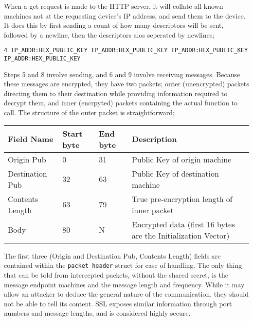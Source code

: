 \documentclass{article}
\begin{document}
When a get request is made to the HTTP server, it will collate all known machines not at the requesting device's IP address, and send them to the device. It does this by first sending a count of how many descriptors will be sent, followed by a newline, then the descriptors alos seperated by newlines;

\texttt{4 \newline
IP\_ADDR:HEX\_PUBLIC\_KEY \newline
IP\_ADDR:HEX\_PUBLIC\_KEY \newline
IP\_ADDR:HEX\_PUBLIC\_KEY \newline
IP\_ADDR:HEX\_PUBLIC\_KEY
}

Steps 5 and 8 involve sending, and 6 and 9 involve receiving messages. Because these messages are encrypted, they have two packets; outer (unencrypted) packets directing them to their destination while providing information required to decrypt them, and inner (encrpyted) packets containing the actual function to call. The structure of the outer packet is straightforward;

\begin{table}[h]
\begin{tabular}{|p{25mm}|l|l|p{45mm}|}
\hline
\textbf{Field Name}	& \textbf{Start byte}	& \textbf{End byte}		& \textbf{Description} \\ \hline
Origin Pub					& 0									& 31							& Public Key of origin machine \\ \hline
Destination Pub			& 32								& 63							& Public Key of destination machine \\ \hline
Contents Length			& 63								& 79							& True pre-encryption length of inner packet \\ \hline
Body								& 80								& N								& Encrypted data (first 16 bytes are the Initialization Vector) \\ \hline
\end{tabular}
\end{table}

The first three (Origin and Destination Pub, Contents Length) fields are contained within the \texttt{packet\_header} struct for ease of handling. The only thing that can be told from intercepted packets, without the shared secret, is the message endpoint machines and the message length and frequency. While it may allow an attacker to deduce the general nature of the communication, they should not be able to tell its content. SSL exposes similar information through port numbers and message lengths, and is considered highly secure.
\end{document}
